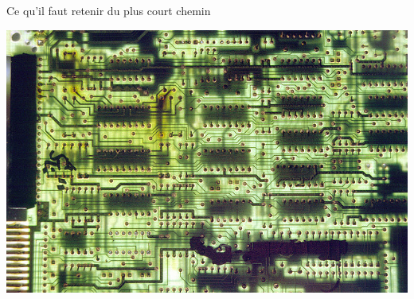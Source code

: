\documentclass[final,hyperref={pdfpagelabels=false}]{beamer}
\begin{document}
\begin{frame}{Ce qu'il faut retenir du plus court chemin}
  \centerline{\includegraphics[width=.7\linewidth]{img/electric_city.jpg}\label{img:electric:city}}
\end{frame}
\end{document}
